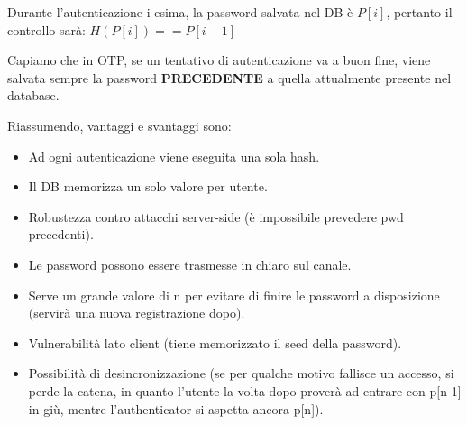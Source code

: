   \begin{note}
    Durante l'autenticazione i-esima, la password salvata nel DB è $P[i]$, pertanto il controllo sarà: $H(P[i])==P[i-1]$
    \end{note}
\begin{remark}
Capiamo che in OTP, se un tentativo di autenticazione va a buon fine, viene salvata sempre la password \textbf{PRECEDENTE} a quella attualmente presente nel database.
\end{remark}
Riassumendo, vantaggi e svantaggi sono: 
\begin{itemize}
    \item [\textcolor{green}{\checkmark}]Ad ogni autenticazione viene eseguita una sola hash.
    \item [\textcolor{green}{\checkmark}]Il DB memorizza un solo valore per utente.
    \item [\textcolor{green}{\checkmark}]Robustezza contro attacchi server-side (è impossibile prevedere pwd precedenti).
    \item [\textcolor{green}{\checkmark}]Le password possono essere trasmesse in chiaro sul canale.
    \item [\textcolor{red}{\ding{55}}]Serve un grande valore di n per evitare di finire le password a disposizione (servirà una nuova registrazione dopo).
    \item [\textcolor{red}{\ding{55}}]Vulnerabilità lato client (tiene memorizzato il seed della password).
    \item [\textcolor{red}{\ding{55}}]Possibilità di desincronizzazione (se per qualche motivo fallisce un accesso, si perde la catena, in quanto l'utente la volta dopo proverà ad entrare con p[n-1] in giù, mentre l'authenticator si aspetta ancora p[n]).
\end{itemize}
